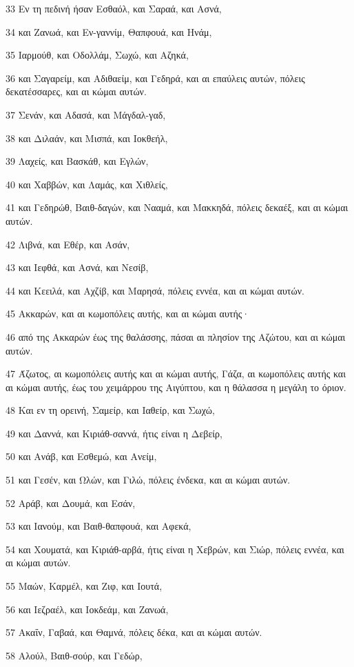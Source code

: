 \par 33 Εν τη πεδινή ήσαν Εσθαόλ, και Σαραά, και Ασνά,
\par 34 και Ζανωά, και Εν-γαννίμ, Θαπφουά, και Ηνάμ,
\par 35 Ιαρμούθ, και Οδολλάμ, Σωχώ, και Αζηκά,
\par 36 και Σαγαρείμ, και Αδιθαείμ, και Γεδηρά, και αι επαύλεις αυτών, πόλεις δεκατέσσαρες, και αι κώμαι αυτών.
\par 37 Σενάν, και Αδασά, και Μάγδαλ-γαδ,
\par 38 και Διλαάν, και Μισπά, και Ιοκθεήλ,
\par 39 Λαχείς, και Βασκάθ, και Εγλών,
\par 40 και Χαββών, και Λαμάς, και Χιθλείς,
\par 41 και Γεδηρώθ, Βαιθ-δαγών, και Νααμά, και Μακκηδά, πόλεις δεκαέξ, και αι κώμαι αυτών.
\par 42 Λιβνά, και Εθέρ, και Ασάν,
\par 43 και Ιεφθά, και Ασνά, και Νεσίβ,
\par 44 και Κεειλά, και Αχζίβ, και Μαρησά, πόλεις εννέα, και αι κώμαι αυτών.
\par 45 Ακκαρών, και αι κωμοπόλεις αυτής, και αι κώμαι αυτής·
\par 46 από της Ακκαρών έως της θαλάσσης, πάσαι αι πλησίον της Αζώτου, και αι κώμαι αυτών.
\par 47 Άζωτος, αι κωμοπόλεις αυτής και αι κώμαι αυτής, Γάζα, αι κωμοπόλεις αυτής και αι κώμαι αυτής, έως του χειμάρρου της Αιγύπτου, και η θάλασσα η μεγάλη το όριον.
\par 48 Και εν τη ορεινή, Σαμείρ, και Ιαθείρ, και Σωχώ,
\par 49 και Δαννά, και Κιριάθ-σαννά, ήτις είναι η Δεβείρ,
\par 50 και Ανάβ, και Εσθεμώ, και Ανείμ,
\par 51 και Γεσέν, και Ωλών, και Γιλώ, πόλεις ένδεκα, και αι κώμαι αυτών.
\par 52 Αράβ, και Δουμά, και Εσάν,
\par 53 και Ιανούμ, και Βαιθ-θαπφουά, και Αφεκά,
\par 54 και Χουματά, και Κιριάθ-αρβά, ήτις είναι η Χεβρών, και Σιώρ, πόλεις εννέα, και αι κώμαι αυτών.
\par 55 Μαών, Καρμέλ, και Ζιφ, και Ιουτά,
\par 56 και Ιεζραέλ, και Ιοκδεάμ, και Ζανωά,
\par 57 Ακαΐν, Γαβαά, και Θαμνά, πόλεις δέκα, και αι κώμαι αυτών.
\par 58 Αλούλ, Βαιθ-σούρ, και Γεδώρ,
